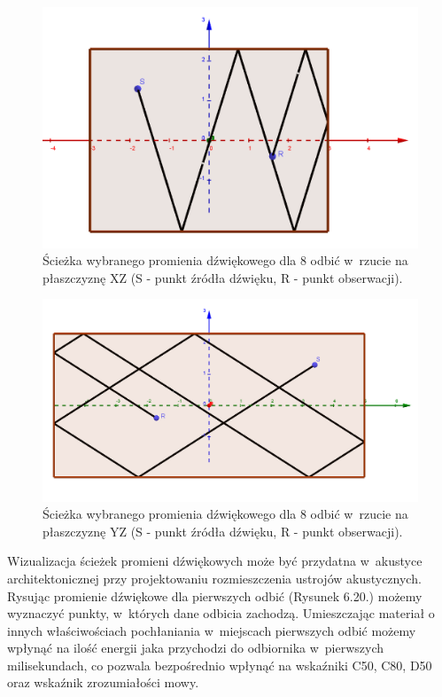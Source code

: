 \begin{figure}[H]
        \centering
                \centering
                \includegraphics[width=12cm]{odbiciay}
	\caption{Ścieżka wybranego promienia dźwiękowego dla 8 odbić w~rzucie na płaszczyznę XZ (S - punkt źródła dźwięku, R - punkt obserwacji).}
\end{figure}

\begin{figure}[H]
        \centering
                \centering
                \includegraphics[width=12cm]{odbiciax}
	\caption{Ścieżka wybranego promienia dźwiękowego dla 8 odbić w~rzucie na płaszczyznę YZ (S - punkt źródła dźwięku, R - punkt obserwacji).}
\end{figure}

Wizualizacja ścieżek promieni dźwiękowych może być przydatna w~akustyce architektonicznej przy projektowaniu rozmieszczenia ustrojów akustycznych. Rysując promienie dźwiękowe dla pierwszych odbić (Rysunek 6.20.) możemy wyznaczyć punkty, w~których dane odbicia zachodzą. Umieszczając materiał o innych właściwościach pochłaniania w~miejscach pierwszych odbić możemy wpłynąć na ilość energii jaka przychodzi do odbiornika w~pierwszych milisekundach, co pozwala bezpośrednio wpłynąć na wskaźniki C50, C80, D50 oraz wskaźnik zrozumiałości mowy.

